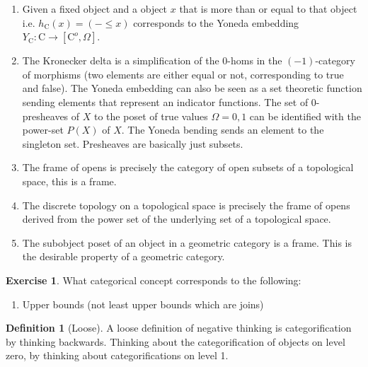 \documentclass[10pt]{article}
\theoremstyle{plain}%
\theoremstyle{definition}
\newtheorem{definition}{Definition}[section]
\newtheorem{exercise}{Exercise}[section]
\theoremstyle{remark}
\begin{document}
\begin{enumerate}
	\item Given a fixed object and a object $x$ that is more than or equal to that object i.e. $h_\mathrm{C}(x) = (- \leq x)$ corresponds to the Yoneda embedding $Y_\mathrm{C} : \mathrm{C} \rightarrow [\mathrm{C}^o, \Omega]$.
	\item The Kronecker delta is a simplification of the $0$-homs in the $(-1)$-category of morphisms (two elements are either equal or not, corresponding to true and false). The Yoneda embedding can also be seen as a set theoretic function sending elements that represent an indicator functions. The set of $0$-presheaves of $X$ to the poset of true values $\Omega = {0,1}$ can be identified with the power-set $P(X)$ of $X$. The Yoneda bending sends an element to the singleton set. Presheaves are basically just subsets.
	\item The frame of opens is precisely the category of open subsets of a topological space, this is a frame.
	\item The discrete topology on a topological space is precisely the frame of opens derived from the power set of the underlying set of a topological space.
	\item The subobject poset of an object in a geometric category is a frame. This is the desirable property of a geometric category.
\end{enumerate}

\begin{exercise}
What categorical concept corresponds to the following:

\begin{enumerate}
	\item Upper bounds (not least upper bounds which are joins)
\end{enumerate}

\end{exercise}

\begin{definition}[Loose]
	A loose definition of negative thinking is categorification by thinking backwards. Thinking about the categorification of objects on level zero, by thinking about categorifications on level 1.
\end{definition}
\end{document}
